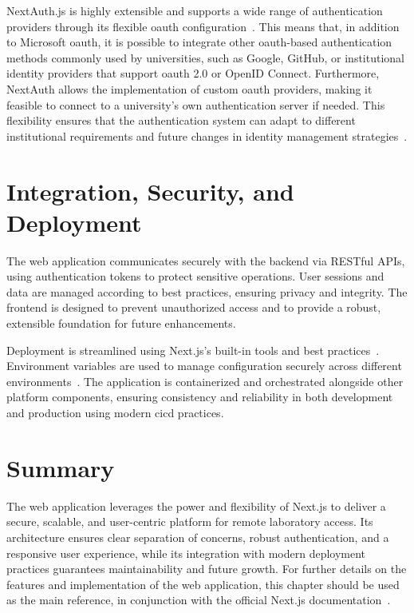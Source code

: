 NextAuth.js is highly extensible and supports a wide range of authentication providers through its flexible \ac{oauth} configuration~\cite{nextjs-authentication}. This means that, in addition to Microsoft \ac{oauth}, it is possible to integrate other \ac{oauth}-based authentication methods commonly used by universities, such as Google, GitHub, or institutional identity providers that support \ac{oauth} 2.0 or OpenID Connect. Furthermore, NextAuth allows the implementation of custom \ac{oauth} providers, making it feasible to connect to a university's own authentication server if needed. This flexibility ensures that the authentication system can adapt to different institutional requirements and future changes in identity management strategies~\cite{nextjs-authentication}.

\section{Integration, Security, and Deployment}

The web application communicates securely with the backend via RESTful APIs, using authentication tokens to protect sensitive operations. User sessions and data are managed according to best practices, ensuring privacy and integrity. The frontend is designed to prevent unauthorized access and to provide a robust, extensible foundation for future enhancements.

Deployment is streamlined using Next.js's built-in tools and best practices~\cite{nextjs-deployment}. Environment variables are used to manage configuration securely across different environments~\cite{nextjs-env-vars}. The application is containerized and orchestrated alongside other platform components, ensuring consistency and reliability in both development and production using modern \ac{cicd} practices.

\section{Summary}

The web application leverages the power and flexibility of Next.js to deliver a secure, scalable, and user-centric platform for remote laboratory access. Its architecture ensures clear separation of concerns, robust authentication, and a responsive user experience, while its integration with modern deployment practices guarantees maintainability and future growth. For further details on the features and implementation of the web application, this chapter should be used as the main reference, in conjunction with the official Next.js documentation~\cite{nextjs-docs}. 